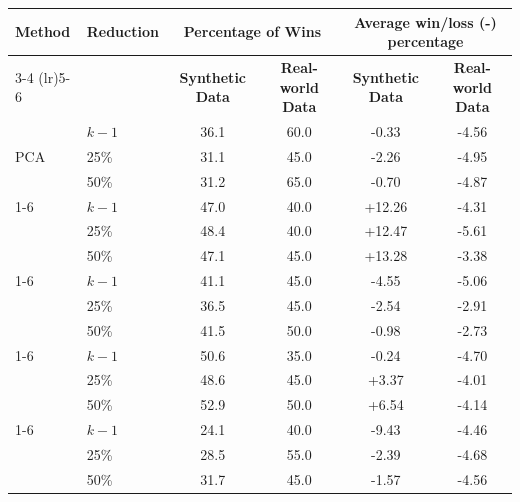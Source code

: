 \begin{tabular}{l l cc cc}
\toprule
\textbf{Method} & \textbf{Reduction} & \multicolumn{2}{c}{\textbf{Percentage of Wins}} & \multicolumn{2}{c}{\textbf{Average win/loss (-) percentage}} \\
\cmidrule(lr){3-4} \cmidrule(lr){5-6}
& & \textbf{Synthetic Data} & \textbf{Real-world Data} & \textbf{Synthetic Data} & \textbf{Real-world Data} \\
\midrule
\multirow{3}{*}{PCA} & $k-1$ & 36.1 & 60.0 & -0.33 & -4.56 \\
 & 25\% & 31.1 & 45.0 & -2.26 & -4.95 \\
 & 50\% & 31.2 & 65.0 & -0.70 & -4.87 \\
\cmidrule(lr){1-6}
\multirow{3}{*}{Kernel PCA} & $k-1$ & 47.0 & 40.0 & +12.26 & -4.31 \\
 & 25\% & 48.4 & 40.0 & +12.47 & -5.61 \\
 & 50\% & 47.1 & 45.0 & +13.28 & -3.38 \\
\cmidrule(lr){1-6}
\multirow{3}{*}{VAE} & $k-1$ & 41.1 & 45.0 & -4.55 & -5.06 \\
 & 25\% & 36.5 & 45.0 & -2.54 & -2.91 \\
 & 50\% & 41.5 & 50.0 & -0.98 & -2.73 \\
\cmidrule(lr){1-6}
\multirow{3}{*}{Isomap} & $k-1$ & 50.6 & 35.0 & -0.24 & -4.70 \\
 & 25\% & 48.6 & 45.0 & +3.37 & -4.01 \\
 & 50\% & 52.9 & 50.0 & +6.54 & -4.14 \\
\cmidrule(lr){1-6}
\multirow{3}{*}{MDS} & $k-1$ & 24.1 & 40.0 & -9.43 & -4.46 \\
 & 25\% & 28.5 & 55.0 & -2.39 & -4.68 \\
 & 50\% & 31.7 & 45.0 & -1.57 & -4.56 \\
\bottomrule\end{tabular}
